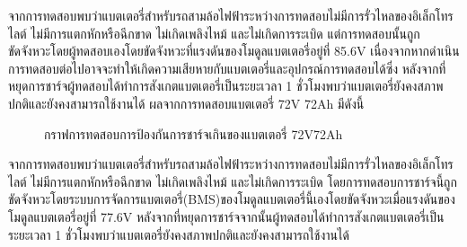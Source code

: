 จากการทดสอบพบว่าแบตเตอรี่สำหรับรถสามล้อไฟฟ้าระหว่างการทดสอบไม่มีการรั่วไหลของอิเล็กโทรไลต์ ไม่มีการแตกหักหรือฉีกขาด ไม่เกิดเพลิงไหม้ และไม่เกิดการระเบิด
แต่การทดสอบนั้นถูกขัดจังหวะโดยผู้ทดสอบเองโดยขัดจังหวะที่แรงดันของโมดูลแบตเตอรี่อยู่ที่ 85.6V เนื่องจากหากดำเนินการทดสอบต่อไปอาจจะทำให้เกิดความเสียหายกับแบตเตอรี่และอุปกรณ์การทดสอบได้ซึ่ง
หลังจากที่หยุดการชาร์จผู้ทดสอบได้ทำการสังเกตแบตเตอรี่เป็นระยะเวลา 1 ชั่วโมงพบว่าแบตเตอรี่ยังคงสภาพปกติและยังคงสามารถใช้งานได้
\newline\hspace*{2cm}
ผลจากการทดสอบแบตเตอรี่ 72V 72Ah มีดังนี้
\begin{center}
	\begin{figure}[H]
		\centering
		\captionsetup{justification=centering,margin=2cm}
		\caption{กราฟการทดสอบการป้องกันการชาร์จเกินของแบตเตอรี่ 72V72Ah}
	\end{figure}
\end{center}
จากการทดสอบพบว่าแบตเตอรี่สำหรับรถสามล้อไฟฟ้าระหว่างการทดสอบไม่มีการรั่วไหลของอิเล็กโทรไลต์ ไม่มีการแตกหักหรือฉีกขาด ไม่เกิดเพลิงไหม้ และไม่เกิดการระเบิด
โดยการทดสอบการชาร์จนี้ถูกขัดจังหวะโดยระบบการจัดการแบตเตอรี่(BMS)ของโมดูลแบตเตอรี่นี้เองโดยขัดจังหวะเมื่อแรงดันของโมดูลแบตเตอรี่อยู่ที่ 77.6V 
หลังจากที่หยุดการชาร์จจากนั้นผู้ทดสอบได้ทำการสังเกตแบตเตอรี่เป็นระยะเวลา 1 ชั่วโมงพบว่าแบตเตอรี่ยังคงสภาพปกติและยังคงสามารถใช้งานได้
